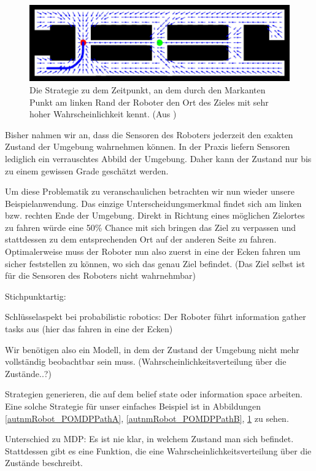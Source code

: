 \documentclass[a4paper]{IEEEtran}
\begin{document}
\begin{figure}[ht]
	\centering
	\includegraphics[scale=0.72]{images/autnmRobot_POMDPPathC.png}
	\caption{Die Strategie zu dem Zeitpunkt, an dem durch den Markanten Punkt am linken Rand der Roboter den Ort des Zieles mit sehr hoher Wahrscheinlichkeit kennt. (Aus \cite{thrun2005probabilistic})}
	\label{autnmRobot_POMDPPathC}
\end{figure}

Bisher nahmen wir an, dass die Sensoren des Roboters jederzeit den exakten Zustand der Umgebung wahrnehmen können. In der Praxis liefern Sensoren lediglich ein verrauschtes Abbild der Umgebung. Daher kann der Zustand nur bis zu einem gewissen Grade geschätzt werden.

Um diese Problematik zu veranschaulichen betrachten wir nun wieder unsere Beispielanwendung. Das einzige Unterscheidungsmerkmal findet sich am linken bzw. rechten Ende der Umgebung. Direkt in Richtung eines möglichen Zielortes zu fahren würde eine 50\% Chance mit sich bringen das Ziel zu verpassen und stattdessen zu dem entsprechenden Ort auf der anderen Seite zu fahren. Optimalerweise muss der Roboter nun also zuerst in eine der Ecken fahren um sicher feststellen zu können, wo sich das genau Ziel befindet. (Das Ziel selbst ist für die Sensoren des Roboters nicht wahrnehmbar)

Stichpunktartig: %

Schlüsselaspekt bei probabilistic robotics: Der Roboter führt information gather tasks aus (hier das fahren in eine der Ecken)

Wir benötigen also ein Modell, in dem der Zustand der Umgebung nicht mehr vollständig beobachtbar sein muss. (Wahrscheinlichkeitsverteilung über die Zustände..?)

Strategien generieren, die auf dem belief state oder information space arbeiten. Eine solche Strategie für unser einfaches Beispiel ist in Abbildungen \ref{autnmRobot_POMDPPathA}, \ref{autnmRobot_POMDPPathB}, \ref{autnmRobot_POMDPPathC} zu sehen.

Unterschied zu MDP: Es ist nie klar, in welchem Zustand man sich befindet. Stattdessen gibt es eine Funktion, die eine Wahrscheinlichkeitsverteilung über die Zustände beschreibt.
\end{document}
